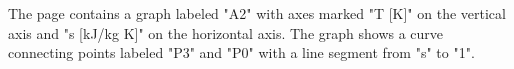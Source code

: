 The page contains a graph labeled "A2" with axes marked "T [K]" on the vertical axis and "s [kJ/kg K]" on the horizontal axis. The graph shows a curve connecting points labeled "P3" and "P0" with a line segment from "s" to "1".